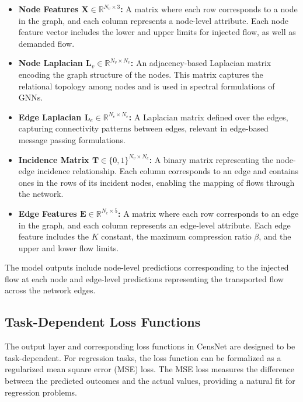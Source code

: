 \begin{itemize}
    \item \textbf{Node Features \(\mathbf{X} \in \mathbb{R}^{N_v \times 3}\):} A matrix where each row corresponds to a node in the graph, and each column represents a node-level attribute. Each node feature vector includes the lower and upper limits for injected flow, as well as demanded flow.

    \item \textbf{Node Laplacian \(\mathbf{L}_v \in \mathbb{R}^{N_v \times N_v}\):} An adjacency-based Laplacian matrix encoding the graph structure of the nodes. This matrix captures the relational topology among nodes and is used in spectral formulations of GNNs.

    \item \textbf{Edge Laplacian \(\mathbf{L}_e \in \mathbb{R}^{N_e \times N_e}\):} A Laplacian matrix defined over the edges, capturing connectivity patterns between edges, relevant in edge-based message passing formulations.

    \item \textbf{Incidence Matrix \(\mathbf{T} \in \{0,1\}^{N_v \times N_e}\):} A binary matrix representing the node-edge incidence relationship. Each column corresponds to an edge and contains ones in the rows of its incident nodes, enabling the mapping of flows through the network.

    \item \textbf{Edge Features \(\mathbf{E} \in \mathbb{R}^{N_e \times 5}\):} A matrix where each row corresponds to an edge in the graph, and each column represents an edge-level attribute. Each edge feature includes the \(K\) constant, the maximum compression ratio \(\beta\), and the upper and lower flow limits.
\end{itemize}


The model outputs include node-level predictions corresponding to the injected flow at each node and edge-level predictions representing the transported flow across the network edges.

\subsection{Task-Dependent Loss Functions}

The output layer and corresponding loss functions in CensNet are designed to be task-dependent. For regression tasks, the loss function can be formalized as a regularized mean square error (MSE) loss. The MSE loss measures the difference between the predicted outcomes and the actual values, providing a natural fit for regression problems.


